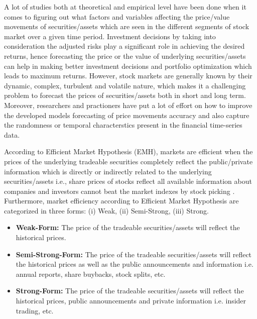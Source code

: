 \documentclass[conference]{IEEEtran}
\begin{document}
A lot of studies both at theoretical and empirical level have been done when it comes to figuring out what factors and variables affecting the price/value movements of securities/assets which are seen in the different segments of stock market over a given time period. Investment decisions by taking into consideration the adjusted risks play a significant role in achieving the desired returns, hence forecasting the price or the value of underlying securities/assets can help in making better investment decisions and portfolio optimization which leads to maximum returns. However, stock markets are generally known by their dynamic, complex, turbulent and volatile nature, which makes it a challenging problem to forecast the prices of securities/assets both in short and long term. Moreover, researchers and practioners have put a lot of effort on how to improve the developed models forecasting of price movements accuracy and also capture the randomness or temporal characterstics present in the financial time-series data.

According to Efficient Market Hypothesis (EMH), markets are efficient when the prices of the underlying tradeable securities completely reflect the public/private information which is directly or indirectly related to the underlying securities/assets i.e., share prices of stocks reflect all available information about companies and investors cannot beat the market indexes by stock picking \cite{b1}. Furthermore, market efficiency according to Efficient Market Hypothesis are categorized in three forms: (i) Weak, (ii) Semi-Strong, (iii) Strong.

\begin{itemize}
    \item \textbf{Weak-Form:} The price of the tradeable securities/assets will reflect the historical prices.
    \item \textbf{Semi-Strong-Form:} The price of the tradeable securities/assets will reflect the historical prices as well as the public announcements and information i.e. annual reports, share buybacks, stock splits, etc. 
    \item \textbf{Strong-Form:} The price of the tradeable securities/assets will reflect the historical prices, public announcements and private information i.e. insider trading, etc.
\end{itemize}
\end{document}
